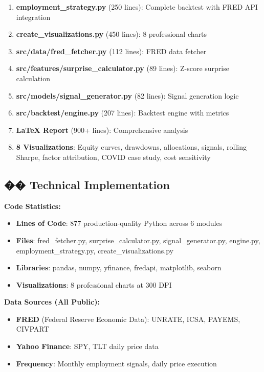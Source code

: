 \documentclass[12pt,a4paper]{article}
\begin{document}
\begin{enumerate}
    \item \textbf{employment\_strategy.py} (250 lines): Complete backtest with FRED API integration
    \item \textbf{create\_visualizations.py} (450 lines): 8 professional charts
    \item \textbf{src/data/fred\_fetcher.py} (112 lines): FRED data fetcher
    \item \textbf{src/features/surprise\_calculator.py} (89 lines): Z-score surprise calculation
    \item \textbf{src/models/signal\_generator.py} (82 lines): Signal generation logic
    \item \textbf{src/backtest/engine.py} (207 lines): Backtest engine with metrics
    \item \textbf{LaTeX Report} (900+ lines): Comprehensive analysis
    \item \textbf{8 Visualizations}: Equity curves, drawdowns, allocations, signals, rolling Sharpe, factor attribution, COVID case study, cost sensitivity
\end{enumerate}

\subsection*{�� Technical Implementation}

\textbf{Code Statistics:}
\begin{itemize}[leftmargin=*]
    \item \textbf{Lines of Code}: 877 production-quality Python across 6 modules
    \item \textbf{Files}: fred\_fetcher.py, surprise\_calculator.py, signal\_generator.py, engine.py, employment\_strategy.py, create\_visualizations.py
    \item \textbf{Libraries}: pandas, numpy, yfinance, fredapi, matplotlib, seaborn
    \item \textbf{Visualizations}: 8 professional charts at 300 DPI
\end{itemize}

\textbf{Data Sources (All Public):}
\begin{itemize}[leftmargin=*]
    \item \textbf{FRED} (Federal Reserve Economic Data): UNRATE, ICSA, PAYEMS, CIVPART
    \item \textbf{Yahoo Finance}: SPY, TLT daily price data
    \item \textbf{Frequency}: Monthly employment signals, daily price execution
\end{itemize}
\end{document}
